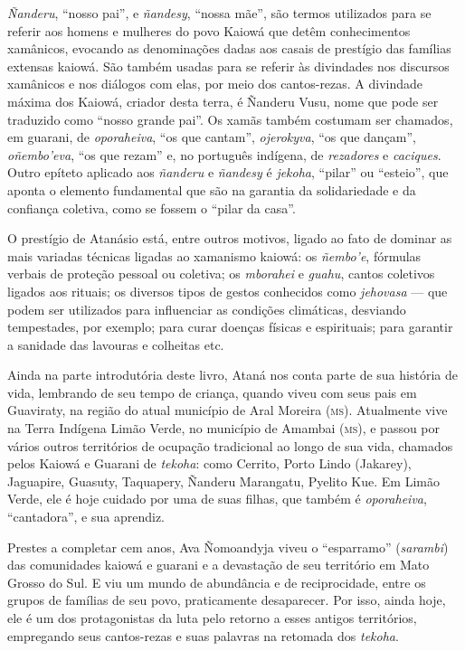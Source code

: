 \textit{Ñanderu}, ``nosso pai'', e \textit{ñandesy}, ``nossa mãe'', são
termos utilizados para se referir aos homens e mulheres do povo Kaiowá
que detêm conhecimentos xamânicos, evocando as denominações dadas aos
casais de prestígio das famílias extensas kaiowá. São também usadas para se
referir às divindades nos discursos xamânicos e nos diálogos com elas,
por meio dos cantos-rezas. A divindade máxima dos Kaiowá, criador desta
terra, é Ñanderu Vusu, nome que pode ser traduzido como ``nosso grande
pai''. Os xamãs também costumam ser chamados, em guarani, de
\textit{oporaheiva}, ``os que cantam'', \textit{ojerokyva}, ``os que
dançam'', \textit{oñembo'eva}, ``os que rezam'' e, no português indígena,
de \textit{rezadores} e \textit{caciques}. Outro epíteto aplicado aos
\textit{ñanderu} e \textit{ñandesy} é \textit{jekoha}, ``pilar'' ou ``esteio'',
que aponta o elemento fundamental que são na garantia da solidariedade e
da confiança coletiva, como se fossem o ``pilar da casa''.

O prestígio de Atanásio está, entre outros motivos, ligado ao fato de
dominar as mais variadas técnicas ligadas ao xamanismo kaiowá: os
\textit{ñembo'e}, fórmulas verbais de proteção pessoal ou coletiva; os
\textit{mborahei} e \textit{guahu}, cantos coletivos ligados aos rituais; os
diversos tipos de gestos conhecidos como \textit{jehovasa} --- que podem ser
utilizados para influenciar as condições climáticas, desviando
tempestades, por exemplo; para curar doenças físicas e espirituais; para
garantir a sanidade das lavouras e colheitas etc.

Ainda na parte introdutória deste livro, Ataná nos conta
parte de sua história de vida, lembrando de seu tempo de criança, quando
viveu com seus pais em Guaviraty, na região do atual município de Aral
Moreira (\textsc{ms}). Atualmente vive na Terra Indígena Limão Verde, no
município de Amambai (\textsc{ms}), e passou por vários outros territórios de ocupação tradicional ao longo de sua vida, chamados pelos
Kaiowá e Guarani de \textit{tekoha}: como Cerrito, Porto Lindo (Jakarey),
Jaguapire, Guasuty, Taquapery, Ñanderu Marangatu, Pyelito Kue. Em Limão
Verde, ele é hoje cuidado por uma de suas filhas, que também é
\textit{oporaheiva}, ``cantadora'', e sua aprendiz.

Prestes a completar cem anos, Ava Ñomoandyja viveu o ``esparramo''
(\textit{sarambi}) das comunidades kaiowá e guarani e a devastação de seu
território em Mato Grosso do Sul. E viu um mundo de abundância e de
reciprocidade, entre os grupos de famílias de seu povo, praticamente
desaparecer. Por isso, ainda hoje, ele é um dos protagonistas da luta
pelo retorno a esses antigos territórios, empregando seus cantos-rezas e
suas palavras na retomada dos \textit{tekoha}.

